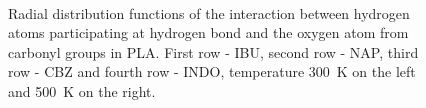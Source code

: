 \begin{figure}[H]
	\\
	\vspace{-0.2cm}
		\vspace{-0.2cm}
	\caption{Radial distribution functions of the interaction between hydrogen atoms participating at hydrogen bond and the oxygen atom from carbonyl groups in PLA. First row - IBU, second row - NAP, third row - CBZ and fourth row - INDO, temperature 300~K on the left and 500~K on the right.}
	\label{fig:carbonyl}
\end{figure}

